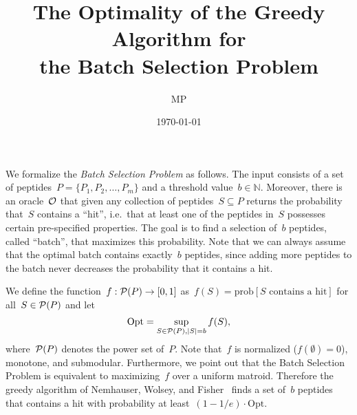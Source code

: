 \documentclass[11pt]{article}
\title{The Optimality of the Greedy Algorithm for\\ the Batch Selection Problem}
\date{\today}
\author{MP}
\begin{document}
\maketitle

We formalize the \emph{Batch Selection Problem} as follows. The input consists of a set of peptides~$P = \{P_1, P_2,\ldots,P_m\}$ and a threshold value~$b \in \mathbb{N}$. Moreover, there is an oracle~$\cal O$ that given any collection of peptides~$S \subseteq P$ returns the probability that~$S$ contains a ``hit'', i.e.\ that at least one of the peptides in~$S$ possesses certain pre-specified properties.
%
The goal is to find a selection of~$b$ peptides, called ``batch'', that maximizes this probability. Note that we can always assume that the optimal batch contains exactly~$b$ peptides, since adding more peptides to the batch never decreases the probability that it contains a hit.

We define the function~$f: {\cal P}(P) \to [0,1]$ as~$f(S) = \mathrm{prob}[\text{$S$ contains a hit}]$ for all~$S \in {\cal P}(P)$ and let~$$\mathrm{Opt} = \sup_{S \in {\cal P}(P), |S| = b} f(S),$$ where~${\cal P}(P)$ denotes the power set of~$P$. Note that~$f$ is normalized ($f(\emptyset) = 0$), monotone, and submodular. 
%
Furthermore, we point out that the Batch Selection Problem is equivalent to maximizing~$f$ over a uniform matroid.
%
Therefore the greedy algorithm of Nemhauser, Wolsey, and Fisher~\cite{nwf78} finds a set of~$b$ peptides that contains a hit with probability at least~$(1 - 1/e) \cdot \mathrm{Opt}$.
\end{document}

